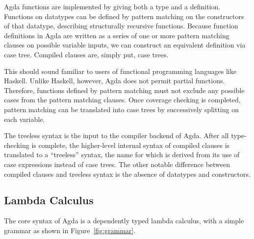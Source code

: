 Agda functions are implemented by giving both a type and a definition. Functions on datatypes can be defined by pattern matching on the constructors of that datatype, describing structurally recursive functions.\cite{agdawiki} %
Because function definitions in Agda are written as a series of one or more pattern matching clauses on possible variable inputs, we can construct an equivalent definition via case tree.\cite{agdawiki} %
Compiled clauses are, simply put, case trees. \newline

This should sound familiar to users of functional programming languages like Haskell. Unlike Haskell, however, Agda does not permit partial functions. Therefore, functions defined by pattern matching must not exclude any possible cases from the pattern matching clauses.\cite{agdawiki} %
Once coverage checking is completed, pattern matching can be translated into case trees by successively splitting on each variable.\cite{agdahackage} %


The treeless syntax is the input to the compiler backend of Agda. After all type-checking is complete, the higher-level internal syntax of compiled clauses is translated to a ``treeless'' syntax, the name for which is derived from its use of case expressions instead of case trees. The other notable difference between compiled clauses and treeless syntax is the absence of datatypes and constructors.\cite{agdahackage} %

\subsection{Lambda Calculus}

The core syntax of Agda is a dependently typed lambda calculus, with a simple grammar as shown in Figure~\ref{fig:grammar}.

